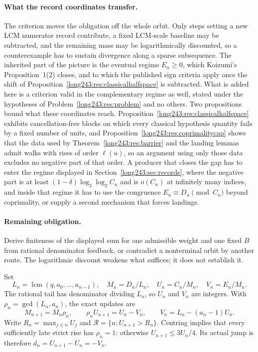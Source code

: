 \documentclass[11pt]{article}
\begin{document}
\paragraph{What the record coordinates transfer.}
The criterion moves the obligation off the whole orbit.  Only steps setting a
new LCM numerator record contribute, a fixed LCM-scale baseline may be
subtracted, and the remaining mass may be logarithmically discounted, so a
counterexample has to sustain divergence along a sparse subsequence.  The
inherited part of the picture is the eventual regime $E_n\ge0$, which Koizumi's
Proposition~1(2) closes, and to which the published sign criteria apply once
the shift of Proposition~\ref{long243:res:classicalhalfspace} is subtracted.  What is
added here is a criterion valid in the complementary regime as well, stated
under the hypotheses of Problem~\ref{long243:res:problem} and no others.  Two
propositions bound what these coordinates reach.
Proposition~\ref{long243:res:classicalhalfspace} exhibits cancellation-free blocks on
which every classical hypothesis quantity fails by a fixed number of units, and
Proposition~\ref{long243:res:coprimalitycap} shows that the data used by
Theorem~\ref{long243:res:barrier} and the landing lemmas admit walks with rises of
order $\ell(u)$, so an argument using only those data excludes no negative
part of that order.  A producer that closes the gap has to enter the regime
displayed in Section~\ref{long243:sec:records}, where the negative part is at least
$(1-\delta)\log_2\log_2C_n$ and is $o(C_n)$ at infinitely many indices, and
inside that regime it has to use the congruence $E_n\equiv D_n\pmod{C_n}$
beyond coprimality, or supply a second mechanism that forces landings.

\paragraph{Remaining obligation.}
Derive finiteness of the displayed sum for one admissible weight and one fixed
$B$ from rational denominator feedback, or contradict a nonterminal orbit by
another route.  The logarithmic discount weakens what suffices; it does not
establish it.

Set
\[
 L_n=\operatorname{lcm}(q,a_0,\ldots,a_{n-1}),\quad
 M_n=D_n/L_n,\quad U_n=C_n/M_n,\quad V_n=E_n/M_n.
\]
The rational tail has denominator dividing $L_n$, so $U_n$ and $V_n$ are
integers. With $\rho_n=\gcd(L_n,a_n)$, the exact updates are
\[
 M_{n+1}=M_n\rho_n,\qquad
 \rho_nU_{n+1}=U_n-V_n,\qquad V_n=L_n-(a_n-1)U_n.
\]
Write $R_n=\max_{j\le n}U_j$ and
$\mathcal R=\{n:U_{n+1}>R_n\}$. Centring implies that every sufficiently
late strict rise has $\rho_n=1$: otherwise $U_{n+1}\le3U_n/4$.
Its actual jump is therefore $d_n=U_{n+1}-U_n=-V_n$.
\end{document}
